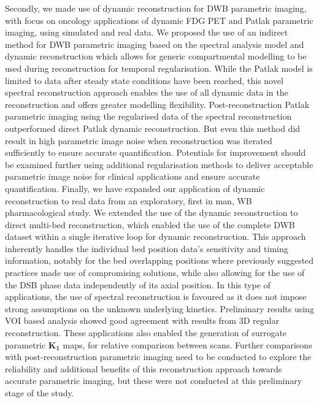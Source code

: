 Secondly, we made use of dynamic reconstruction for DWB parametric imaging, with focus on oncology applications of dynamic FDG PET and Patlak parametric imaging, using simulated and real data.
We proposed the use of an indirect method for DWB parametric imaging based on the spectral analysis model and dynamic reconstruction which allows for generic compartmental modelling to be used during reconstruction for temporal regularisation. While the Patlak model is limited to data after steady state conditions have been reached, this novel spectral reconstruction approach enables the use of all dynamic data in the reconstruction and offers greater modelling flexibility. Post-reconstruction Patlak parametric imaging using the regularised data of the spectral reconstruction outperformed direct Patlak dynamic reconstruction. But even this method did result in high parametric image noise when reconstruction was iterated sufficiently to ensure accurate quantification. Potentials for improvement should be examined further using additional regularisation methods to deliver acceptable parametric image noise for clinical applications and ensure accurate quantification.
Finally, we have expanded our application of dynamic reconstruction to real data from an exploratory, first in man, WB pharmacological study. We extended the use of the dynamic reconstruction to direct multi-bed reconstruction, which enabled the use of the complete DWB dataset within a single iterative loop for dynamic reconstruction. This approach inherently handles the individual bed position data's sensitivity and timing information, notably for the bed overlapping positions where previously suggested practices made use of compromising solutions, while also allowing for the use of the DSB phase data independently of its axial position. In this type of applications, the use of spectral reconstruction is favoured as it does not impose strong assumptions on the unknown underlying kinetics. Preliminary results using VOI based analysis showed good agreement with results from 3D regular reconstruction. These applications also enabled the generation of surrogate parametric $\boldsymbol{K_1}$ maps, for relative comparison between scans.
Further comparisons with post-reconstruction parametric imaging need to be conducted to explore the reliability and additional benefits of this reconstruction approach towards accurate parametric imaging, but these were not conducted at this preliminary stage of the study.


